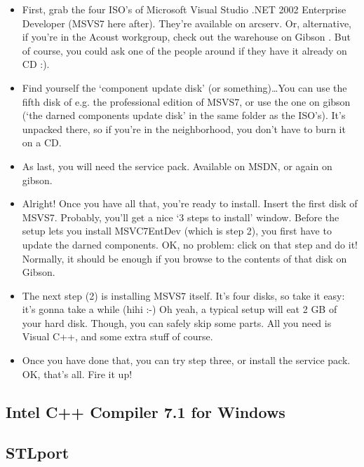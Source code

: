 \documentclass[10pt,a4paper,titlepage,dutch]{report}
\begin{document}
\begin{itemize}

\item First, grab the four ISO's of Microsoft Visual Studio .NET
2002 Enterprise Developer (MSVS7 here after).  They're available
on arcserv. Or, alternative, if you're in the Acoust workgroup,
check out the warehouse on Gibson \cite{Gibson}. But of course,
you could ask one of the people around if they have it already on
CD :).

\item Find yourself the `component update disk' (or something)\dots You
can use the fifth disk of e.g. the professional edition of MSVS7,
or use the one on gibson (`the darned components update disk' in
the same folder as the ISO's). It's unpacked there, so if you're
in the neighborhood, you don't have to burn it on a CD.

\item As last, you will need the service pack.  Available on MSDN, or
again on gibson.

\item Alright!  Once you have all that, you're ready to install.  Insert
the first disk of MSVS7.  Probably, you'll get a nice `3 steps to
install' window.  Before the setup lets you install MSVC7EntDev
(which is step 2), you first have to update the darned components.
OK, no problem: click on that step and do it! Normally, it should
be enough if you browse to the contents of that disk on Gibson.

\item The next step (2) is installing MSVS7 itself.  It's four disks, so
take it easy: it's gonna take a while (hihi :-)  Oh yeah, a
typical setup will eat 2 GB of your hard disk.  Though, you can
safely skip some parts.  All you need is Visual C++, and some
extra stuff of course.

\item Once you have done that, you can try step three, or install the
service pack.  OK, that's all.  Fire it up!

\end{itemize}

\subsection{Intel C++ Compiler 7.1 for
Windows}

\subsection{STLport}
\end{document}
